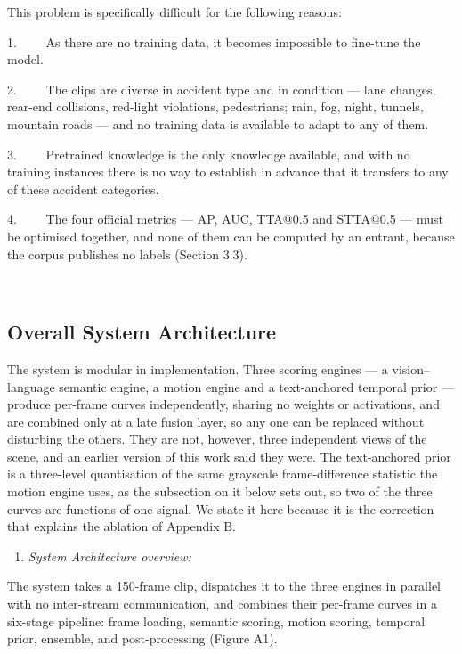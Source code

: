 This problem is specifically difficult for the following reasons:

1.~~~~ As there are no training data, it becomes impossible to fine-tune the model.

2.~~~~ The clips are diverse in accident type and in condition --- lane changes, rear-end collisions, red-light violations, pedestrians; rain, fog, night, tunnels, mountain roads --- and no training data is available to adapt to any of them.

3.~~~~ Pretrained knowledge is the only knowledge available, and with no training instances there is no way to establish in advance that it transfers to any of these accident categories.

4.~~~~ The four official metrics --- AP, AUC, TTA@0.5 and STTA@0.5 --- must be optimised together, and none of them can be computed by an entrant, because the corpus publishes no labels (Section 3.3).

~


\subsection{Overall System Architecture}

The system is modular in implementation. Three scoring engines --- a vision--language semantic engine, a motion engine and a text-anchored temporal prior --- produce per-frame curves independently, sharing no weights or activations, and are combined only at a late fusion layer, so any one can be replaced without disturbing the others. They are not, however, three independent views of the scene, and an earlier version of this work said they were. The text-anchored prior is a three-level quantisation of the same grayscale frame-difference statistic the motion engine uses, as the subsection on it below sets out, so two of the three curves are functions of one signal. We state it here because it is the correction that explains the ablation of Appendix B.

\begin{enumerate}
\def\labelenumi{\arabic{enumi}.}
\item
  \emph{System Architecture overview:}
\end{enumerate}

The system takes a 150-frame clip, dispatches it to the three engines in parallel with no inter-stream communication, and combines their per-frame curves in a six-stage pipeline: frame loading, semantic scoring, motion scoring, temporal prior, ensemble, and post-processing (Figure A1).

